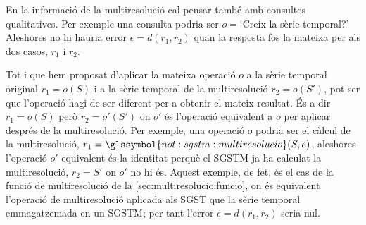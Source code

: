 En la informació de la multiresolució cal pensar també amb consultes
qualitatives. Per exemple una consulta podria ser $o=$`Creix la sèrie
temporal?' Aleshores no hi hauria error $\epsilon=d(r_1,r_2)$ quan la
resposta fos la mateixa per als dos casos, $r_1$ i $r_2$.


Tot i que hem proposat d'aplicar la mateixa operació $o$ a la
sèrie temporal original $r_1=o(S)$ i a la sèrie temporal de la
multiresolució $r_2=o(S')$, pot ser que l'operació hagi de ser
diferent per a obtenir el mateix resultat. És a dir $r_1=o(S)$ però
$r_2=o'(S')$ on $o'$ és l'operació equivalent a $o$ per aplicar
després de la multiresolució.  Per exemple, una operació $o$ podria
ser el càlcul de la multiresolució,
$r_1=\glssymbol{not:sgstm:multiresolucio}(S,e)$, aleshores l'operació
$o'$ equivalent és la identitat perquè el \gls{SGSTM} ja ha calculat
la multiresolució, $r_2=S'$ on $o'$ no hi és. Aquest exemple, de fet,
és el cas de la funció de multiresolució de la
\autoref{sec:multiresolucio:funcio}, on és equivalent l'operació de
multiresolució aplicada als \gls{SGST} que la sèrie temporal
emmagatzemada en un \gls{SGSTM}; per tant l'error
$\epsilon =d(r_1,r_2)$ seria nul.



